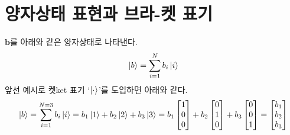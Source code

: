 \documentclass[a4paper,atbegshi,chapter,itemph,hidelinks]{oblivoir}
\begin{document}
\section{양자상태 표현과 브라-켓 표기}
$\mathbf{b}$를 아래와 같은 양자상태로 나타낸다.
\[
  \ket{b}=\sum_{i=1}^N b_i\ket{i}
\]
앞선 예시로 켓{\footnotesize ket} 표기 `$\ket{\cdot}$'를 도입하면 아래와 같다.
\[
  \ket{b}=\sum_{i=1}^{N=3}b_i\ket{i}=b_1\ket1+b_2\ket2+b_3\ket3=
  b_1\begin{bmatrix}1\\0\\0\end{bmatrix}+b_2\begin{bmatrix}0\\1\\0\end{bmatrix}+
  b_3\begin{bmatrix}0\\0\\1\end{bmatrix}=\begin{bmatrix}b_1\\b_2\\b_3\end{bmatrix}
\]
\end{document}
